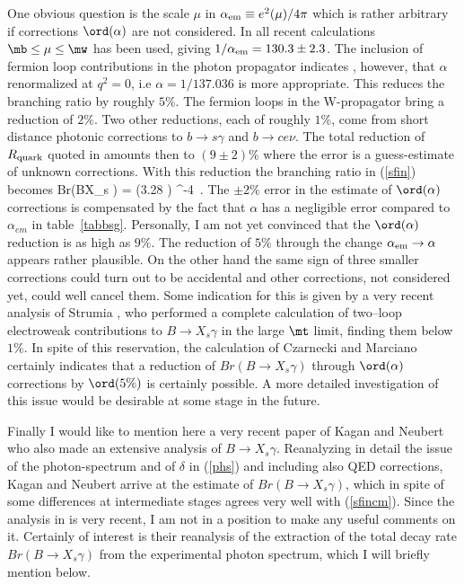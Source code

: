 One obvious question is the scale $\mu$ in 
$\alpha_{\rm em}\equiv e^2(\mu)/4\pi$ which is rather arbitrary
if corrections $\ord(\alpha)$ are not considered. In all recent
calculations $\mb\le \mu\le\mw$ has been used, giving
$1/\alpha_{\rm em}=130.3\pm 2.3$. The inclusion of fermion
loop contributions in the photon propagator indicates \cite{CZMA},
however, that $\alpha$ renormalized at $q^2=0$, i.e
$\alpha=1/137.036$ is more appropriate. This reduces the branching
ratio by roughly $5\%$. The fermion loops in the W-propagator
bring a reduction of $2\%$. Two other reductions, 
each of roughly $1\%$,
come from short distance photonic corrections to $b\to s\gamma$
and $b\to ce\nu$. The total reduction of $R_{\rm quark}$ 
quoted in \cite{CZMA} amounts then to $(9\pm2)\%$ where the
error is a guess-estimate of unknown corrections.
With this reduction
the branching ratio in (\ref{sfin}) becomes
\be\label{sfincm}
Br(B{\to}X_s \gamma) 
= (3.28 )  ^{-4}~.
\ee
The $\pm 2\%$ error in the estimate of $\ord(\alpha)$ corrections
is compensated by the fact that $\alpha$ has a negligible error
compared to $\alpha_{em}$ in table~\ref{tabbsg}.
Personally, I am not yet convinced that the $\ord(\alpha)$ 
reduction is as high as $9\%$. The reduction of $5\%$ through
the change $\alpha_{\rm em}\to \alpha$ appears rather plausible.
On the other hand the same sign of three smaller corrections
could turn out to be accidental and other corrections, not considered
yet, could well cancel them. 
Some indication for this is given by a very recent analysis of
Strumia \cite{STRUMIA}, who performed a complete calculation of
two--loop electroweak contributions to $B\to X_s\gamma$ in the
large $\mt$ limit, finding them below $1\%$.
In spite of this reservation, the
calculation of Czarnecki and Marciano certainly indicates that
a reduction of $Br(B{\to}X_s \gamma)$ through $\ord(\alpha)$ corrections
by $\ord(5\%)$ is certainly possible. A more detailed investigation
of this issue would be desirable at some stage in the future. 

Finally I would like to mention here a very recent paper of Kagan and
Neubert \cite{KN98} who also made an extensive analysis of $B\to X_s\gamma$.
Reanalyzing in detail the issue of the 
photon-spectrum and of $\delta$ in (\ref{phs}) and including also
QED corrections, Kagan and Neubert arrive
at the estimate of $Br(B{\to}X_s \gamma)$, 
which in spite of some differences at intermediate stages agrees very
well with (\ref{sfincm}). Since the analysis in \cite{KN98} is very
recent, I am not in a position to make any useful comments on it.
Certainly of interest is their reanalysis of the extraction of
the total decay rate $Br(B{\to}X_s \gamma)$ from the experimental 
photon spectrum, which I will briefly mention below.

